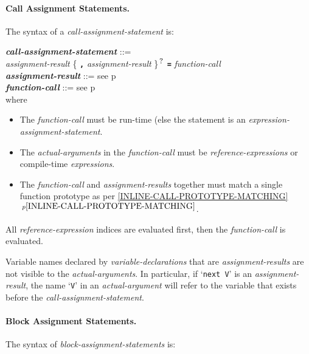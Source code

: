 \documentclass[12pt]{article}
\newcommand{\subsubsubsection}[1]{\paragraph[#1]{#1.}}
\newcommand{\TT}[1]{{\tt \bfseries #1}}
\newcommand{\QMARK}{{$^{\,\mbox{\footnotesize ?}}$}}
\newcommand{\emkey}[1]{{\em \bfseries #1}}
\newcommand{\itemref}[1]{\ref{#1}$\,^{p\pageref{#1}}$}
\newcommand{\pagref}[1]{p\pageref{#1}}
\newenvironment{indpar}[1][0.3in]%
	{\begin{list}{}%
		     {\setlength{\itemsep}{0in}%
		      \setlength{\topsep}{0in}%
		      \setlength{\parsep}{1ex}%
		      \setlength{\labelwidth}{#1}%
		      \setlength{\leftmargin}{#1}%
		      \addtolength{\leftmargin}{\labelsep}}%
	 \item}%
	{\end{list}}
\begin{document}
\subsubsubsection{Call Assignment Statements}
\label{CALL-ASSIGNMENT-STATEMENTS}

The syntax of a {\em call-assignment-statement} is:
\begin{indpar}
\emkey{call-assignment-statement} ::= \\
\hspace*{0.5in} {\em assignment-result}
                \{ \TT{,} {\em assignment-result} \}\QMARK{}
		\TT{=} {\em function-call}
\\[0.5ex]
\emkey{assignment-result} ::= see \pagref{ASSIGNMENT-RESULT}
\\[0.5ex]
\emkey{function-call} ::= see \pagref{FUNCTION-CALL}
\\[2.0ex]
where
\begin{itemize}

\item The {\em function-call} must be run-time (else the statement is
an {\em expression-assign\-ment-statement}.

\item The {\em actual-arguments} in the {\em function-call} must be
{\em reference-expressions} or
com\-pile-time {\em expressions}.

\item The {\em function-call} and {\em assignment-results} together
must match a single function prototype as per
\itemref{INLINE-CALL-PROTOTYPE-MATCHING}.
\end{itemize}
\end{indpar}

All {\em reference-expression} indices are evaluated first,
then the {\em function-call} is evaluated.

Variable names declared by {\em variable-declarations} that are
{\em assignment-results} are not visible to the {\em actual-arguments}.
In particular, if `{\tt next V}' is an {\em assignment-result},
the name `{\tt V}' in an {\em actual-argument} will refer to the variable
that exists before the {\em call-assignment-statement}.


\subsubsubsection{Block Assignment Statements}
\label{BLOCK-ASSIGNMENT-STATEMENTS}

The syntax of {\em block-assignment-statements} is:
\end{document}
